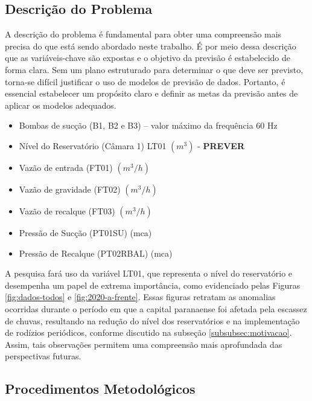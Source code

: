 \subsection{Descri\c c\~ao do Problema} \label{subsec:descricao}

A descrição do problema é fundamental para obter uma compreensão mais precisa do que está sendo abordado neste trabalho. É por meio dessa descrição que as variáveis-chave são expostas e o objetivo da previsão é estabelecido de forma clara. Sem um plano estruturado para determinar o que deve ser previsto, torna-se difícil justificar o uso de modelos de previsão de dados. Portanto, é essencial estabelecer um propósito claro e definir as metas da previsão antes de aplicar os modelos adequados.

\begin{itemize}
	\item Bombas de sucção (B1, B2 e B3) – valor máximo da frequência 60 Hz
	
	\item Nível do Reservatório (Câmara 1) LT01 $ (m^3) $ - \textbf{PREVER}
	
	\item Vazão de entrada (FT01) $ (m^3/h) $
	
	\item Vazão de gravidade (FT02) $ (m^3/h) $
	
	\item Vazão de recalque (FT03) $ (m^3/h) $
	
	\item Pressão de Sucção (PT01SU) (mca)
	
	\item Pressão de Recalque (PT02RBAL) (mca)
\end{itemize}

A pesquisa fará uso da variável LT01, que representa o nível do reservatório e desempenha um papel de extrema importância, como evidenciado pelas Figuras \ref{fig:dados-todos} e \ref{fig:2020-a-frente}. Essas figuras retratam as anomalias ocorridas durante o período em que a capital paranaense foi afetada pela escassez de chuvas, resultando na redução do nível dos reservatórios e na implementação de rodízios periódicos, conforme discutido na subseção \ref{subsubsec:motivacao}. Assim, tais observações permitem uma compreensão mais aprofundada das perspectivas futuras.

\subsection{Procedimentos Metodol{\'o}gicos} \label{subsec:metod}

